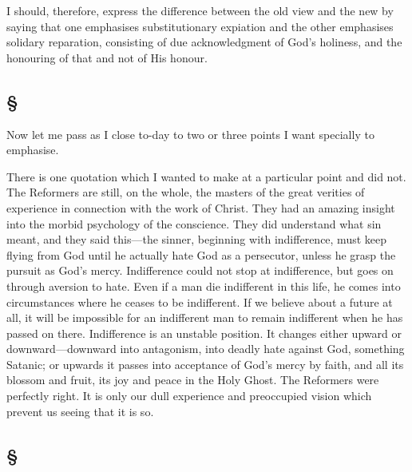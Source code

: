 \documentclass[draft]{ptfdoc}
\begin{document}
I should, therefore, express the difference 
between the old view and the new by saying 
that one emphasises substitutionary expiation 
and the other emphasises solidary reparation, 
consisting of due acknowledgment of God's 
holiness, and the honouring of that and not of 
His honour. 

\subsection*{
\S
}

Now let me pass as I close to-day to two or 
three points I want specially to emphasise. 

There is one quotation which I wanted to 
make at a particular point and did not. The 
Reformers are still, on the whole, the masters of 
the great verities of experience in connection 
with the work of Christ. They had an amazing 
insight into the morbid psychology of the conscience. 
They did understand what sin meant, 
and they said this---the sinner, beginning with 
indifference, must keep flying from God until he 
actually hate God as a persecutor, unless he 
grasp the pursuit as God's mercy. Indifference 
could not stop at indifference, but goes on 
through aversion to hate. Even if a man die 
indifferent in this life, he comes into circumstances 
where he ceases to be indifferent. If we 
believe about a future at all, it will be impossible 
for an indifferent man to remain indifferent 
when he has passed on there. Indifference is 
an unstable position. It changes either upward 
or downward---downward into antagonism, into 
deadly hate against God, something Satanic; or 
upwards it passes into acceptance of God's mercy 
by faith, and all its blossom and fruit, its joy 
and peace in the Holy Ghost. The Reformers 
were perfectly right. It is only our dull experience 
and preoccupied vision which prevent 
us seeing that it is so. 

\subsection*{
\S
}
\end{document}
